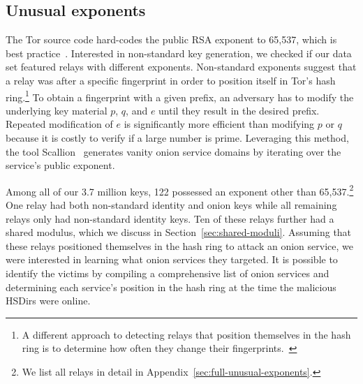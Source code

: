 \subsection{Unusual exponents}
\label{sec:unusual-exponents}
The Tor source code hard-codes the public RSA exponent to 65,537, which is best
practice~\cite[\S~4]{Boneh1999a}.  Interested in non-standard key
generation, we checked if our data set featured relays with different
exponents.  Non-standard exponents suggest that a relay was after a specific
fingerprint in order to position itself in Tor's hash ring.\footnote{A different
approach to detecting relays that position themselves in the hash ring is to
determine how often they change their
fingerprints.~\cite[\S~4.3.3]{Winter2016a}} To obtain a fingerprint with a given
prefix, an adversary has to modify the underlying key material $p$, $q$, and $e$
until they result in the desired prefix.  Repeated modification of $e$ is
significantly more efficient than modifying $p$ or $q$ because it is costly to
verify if a large number is prime.  Leveraging this method, the tool
Scallion~\cite{scallion} generates vanity onion service domains by iterating
over the service's public exponent.

Among all of our 3.7 million keys, 122 possessed an exponent other than
65,537.\footnote{We list all relays in detail in
Appendix~\ref{sec:full-unusual-exponents}.} One relay had both 
non-standard identity and onion keys while all remaining relays only had
non-standard identity keys.  Ten of these relays further had a shared modulus,
which we discuss in Section~\ref{sec:shared-moduli}.  Assuming that these relays
positioned themselves in the hash ring to attack an onion service, we were
interested in learning what onion services they targeted.  It is possible to
identify the victims by compiling a comprehensive list of onion services and
determining each service's position in the hash ring at the time the malicious
HSDirs were online.

